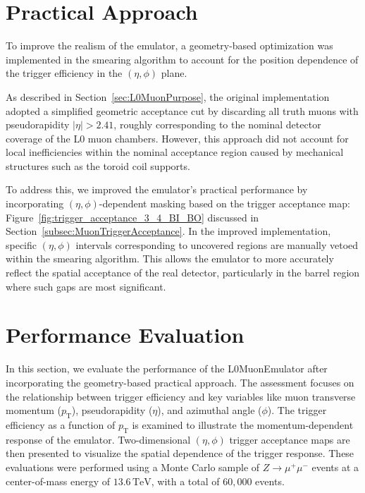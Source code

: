 \section{Practical Approach} \label{sec:RealismApproach}
To improve the realism of the emulator, a geometry-based optimization was implemented in the smearing algorithm to account for the position dependence of the trigger efficiency in the $(\eta, \phi)$ plane.

As described in Section~\ref{sec:L0MuonPurpose}, the original implementation adopted a simplified geometric acceptance cut by discarding all truth muons with pseudorapidity $|\eta| > 2.41$, roughly corresponding to the nominal detector coverage of the L0 muon chambers. However, this approach did not account for local inefficiencies within the nominal acceptance region caused by mechanical structures such as the toroid coil supports.

To address this, we improved the emulator's practical performance by incorporating $(\eta, \phi)$-dependent masking based on the trigger acceptance map: Figure~\ref{fig:trigger_acceptance_3_4_BI_BO} discussed in Section~\ref{subsec:MuonTriggerAcceptance}. In the improved implementation, specific $(\eta, \phi)$ intervals corresponding to uncovered regions are manually vetoed within the smearing algorithm. This allows the emulator to more accurately reflect the spatial acceptance of the real detector, particularly in the barrel region where such gaps are most significant.


\section{Performance Evaluation} \label{sec:L0MuonEmulatorPerformance}
In this section, we evaluate the performance of the L0MuonEmulator after incorporating the geometry-based practical approach. The assessment focuses on the relationship between trigger efficiency and key variables like muon transverse momentum ($p_\mathrm{T}$), pseudorapidity ($\eta$), and azimuthal angle ($\phi$). The trigger efficiency as a function of $p_\mathrm{T}$ is examined to illustrate the momentum-dependent response of the emulator. Two-dimensional $(\eta, \phi)$ trigger acceptance maps are then presented to visualize the spatial dependence of the trigger response. These evaluations were performed using a Monte Carlo sample of $Z \to \mu^+ \mu^-$ events at a center-of-mass energy of $13.6\,\mathrm{TeV}$, with a total of $60{,}000$ events.


